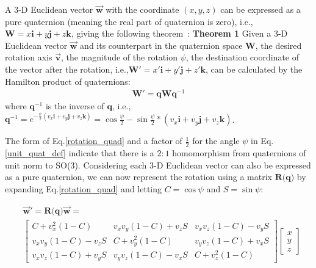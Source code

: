 \documentclass[11pt]{article}
\begin{document}
A 3-D Euclidean vector \(\overrightarrow{\boldsymbol{w}}\) with the coordinate \((x, y, z)\) can be expressed as a pure quaternion (meaning the real part of quaternion is zero), i.e., \(\textbf{W} = x\textbf{i} + y\textbf{j} + z\textbf{k}\), giving the following theorem~\cite{jia2019quaternions}:
\textbf{Theorem 1} Given a 3-D Euclidean vector  \(\overrightarrow{\boldsymbol{w}}\) and its counterpart in the quaternion space \(\textbf{W}\), the desired rotation axis \(\overrightarrow{\boldsymbol{v}}\), the magnitude of the rotation \(\psi\), the destination coordinate of the vector after the rotation, i.e.,\(\textbf{W}' = x'\textbf{i} + y'\textbf{j} + z'\textbf{k}\), can be calculated by the Hamilton product of quaternions:
\begin{equation}
\begin{aligned}
\textbf{W}' = \textbf{q}\textbf{W}\textbf{q}^{-1}
\label{rotation_quad}
\end{aligned}
\end{equation}
\noindent where \(\textbf{q}^{-1}\) is the inverse of \(\textbf{q}\), i.e., \(\textbf{q}^{-1} = e^{-\frac{\psi}{2}(v_x\textbf{i} + v_y\textbf{j} + v_z\textbf{k})} = \cos{\frac{\psi}{2}} - \sin{\frac{\psi}{2}} * (v_x\textbf{i} + v_y\textbf{j} + v_z\textbf{k})\).

The form of Eq.\ref{rotation_quad} and a factor of \(\frac{1}{2}\) for the angle \(\psi\) in Eq.\ref{unit_quat_def} indicate that there is a \(2:1\) homomorphism from quaternions of unit norm to SO(3). Considering each 3-D Euclidean vector can also be expressed as a pure quaternion, we can now represent the rotation using a matrix \(\textbf{R(q)}\) by expanding Eq.\ref{rotation_quad} and letting \(C=\cos{\psi}\) and \(S=\sin{\psi}\):
\begin{scriptsize}
\begin{equation}
\begin{aligned}
& \overrightarrow{\boldsymbol{w}}' = \textbf{R(q)}\overrightarrow{\boldsymbol{w}} = \\ 
& \left[
 \begin{matrix}
   C+v_{x}^{2}(1-C) & v_{x}v_{y}(1-C)+v_{z}S & v_{x}v_{z}(1-C)-v_{y}S \\
   v_{x}v_{y}(1-C)-v_{z}S & C+v_{y}^{2}(1-C) & v_{y}v_{z}(1-C)+v_{x}S \\
   v_{x}v_{z}(1-C)+v_{y}S & v_{y}v_{z}(1-C)-v_{x}S & C+v_{z}^{2}(1-C)
  \end{matrix}
  \right] 
\left[
 \begin{matrix}
   x \\
   y \\
   z
  \end{matrix}
  \right] 
\label{matrix_cal}
\end{aligned}
\end{equation}
\end{scriptsize}
\end{document}

